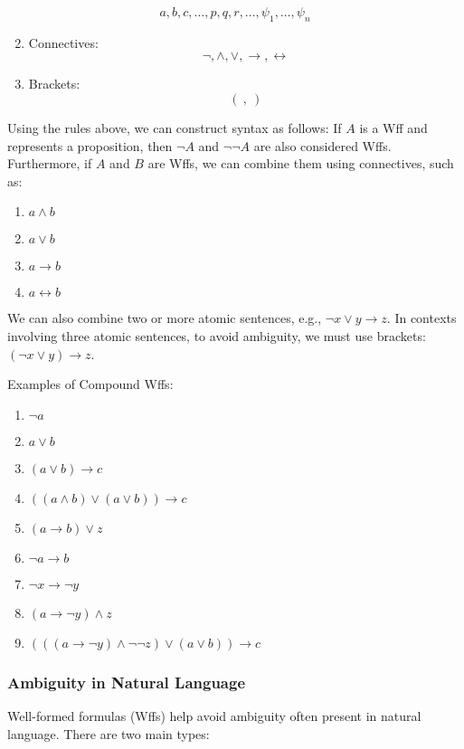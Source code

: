 \documentclass[12pt,a4paper,openany]{article}
\begin{document}
\[
a, b, c, \ldots, p, q, r, \ldots, \psi_1, \ldots, \psi_n
\]

\begin{enumerate}
\setcounter{enumi}{1}
\item Connectives:
\[
\lnot, \land, \lor, \to, \leftrightarrow
\]
\item Brackets:
\[
( \ , \ )
\]
\end{enumerate}

Using the rules above, we can construct syntax as follows:  
If \(A\) is a Wff and represents a proposition, then \(\lnot A\) and \(\lnot\lnot A\) are also considered Wffs. Furthermore, if \(A\) and \(B\) are Wffs, we can combine them using connectives, such as:

\begin{enumerate}
\item \(a \land b\)
\item \(a \lor b\)
\item \(a \to b\)
\item \(a \leftrightarrow b\)
\end{enumerate}

We can also combine two or more atomic sentences, e.g., \(\lnot x \lor y \to z\). In contexts involving three atomic sentences, to avoid ambiguity, we must use brackets: \((\lnot x \lor y) \to z\).

Examples of Compound Wffs:

\begin{enumerate}
\item \(\lnot a\)
\item \(a \lor b\)
\item \((a \lor b) \to c\)
\item \(((a \land b) \lor (a \lor b)) \to c\)
\item \((a \to b) \lor z\)
\item \(\lnot a \to b\)
\item \(\lnot x \to \lnot y\)
\item \((a \to \lnot y) \land z\)
\item \((((a \to \lnot y) \land \lnot\lnot z) \lor (a \lor b)) \to c\)
\end{enumerate}

\subsubsection{Ambiguity in Natural Language}

Well-formed formulas (Wffs) help avoid ambiguity often present in natural language. There are two main types:
\end{document}
